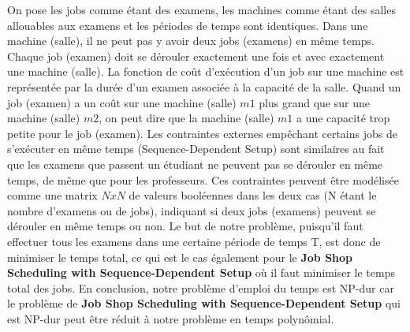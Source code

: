 \documentclass[a4paper,11pt]{article}
\begin{document}
On pose les jobs comme étant des examens, les machines comme étant des salles allouables aux examens et les périodes de temps sont identiques. Dans une machine (salle), il ne peut pas y avoir deux jobs (examens) en même temps. Chaque job (examen) doit se dérouler exactement une fois et avec exactement une machine (salle).
La fonction de coût d'exécution d'un job sur une machine est représentée par la durée d'un examen associée à la capacité de la salle. Quand un job (examen) a un coût sur une machine (salle) $m1$ plus grand que sur une machine (salle) $m2$, on peut dire que la machine (salle) $m1$ a une capacité trop petite pour le job (examen).
Les contraintes externes empêchant certains jobs de s'exécuter en même temps (Sequence-Dependent Setup) sont similaires au fait que les examens que passent un étudiant ne peuvent pas se dérouler en même temps, de même que pour les professeurs. Ces contraintes peuvent être modélisée comme une matrix $ N x N $ de valeurs booléennes dans les deux cas (N étant le nombre d'examens ou de jobs), indiquant si deux jobs (examens) peuvent se dérouler en même temps ou non.
Le but de notre problème, puisqu'il faut effectuer tous les examens dans une certaine période de temps T, est donc de minimiser le temps total, ce qui est le cas également pour le \textbf{Job Shop Scheduling with Sequence-Dependent Setup} où il faut minimiser le temps total des jobs.
En conclusion, notre problème d'emploi du temps est NP-dur car le problème de \textbf{Job Shop Scheduling with Sequence-Dependent Setup} qui est NP-dur peut être réduit à notre problème en temps polynômial.
\end{document}
